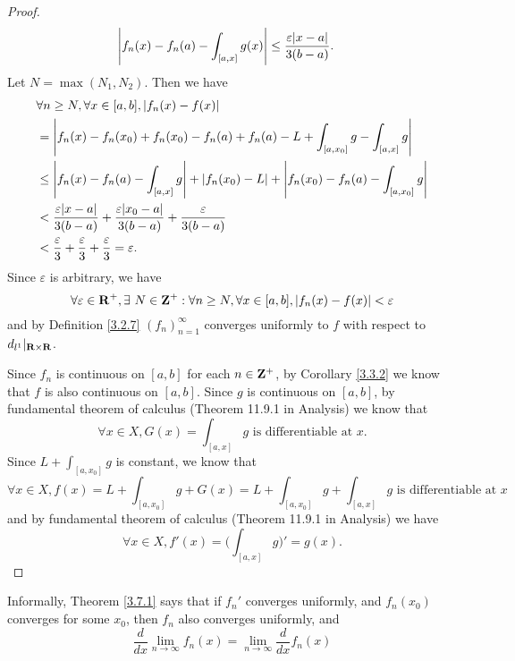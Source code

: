\begin{proof}
\begin{align*}
                 & \abs{f_n(x) - f_n(a) - \int_{[a, x]} g(x)} \leq \frac{\varepsilon \abs{x - a}}{3(b - a)}.
    \end{align*}
    Let \(N = \max(N_1, N_2)\).
    Then we have
    \begin{align*}
         & \forall n \geq N, \forall x \in [a, b], \abs{f_n(x) - f(x)}                                                            \\
         & = \abs{f_n(x) - f_n(x_0) + f_n(x_0) - f_n(a) + f_n(a) - L + \int_{[a, x_0]} g - \int_{[a, x]} g}                       \\
         & \leq \abs{f_n(x) - f_n(a) - \int_{[a, x]} g} + \abs{f_n(x_0) - L} + \abs{f_n(x_0) - f_n(a) - \int_{[a, x_0]} g}        \\
         & < \frac{\varepsilon \abs{x - a}}{3(b - a)} + \frac{\varepsilon \abs{x_0 - a}}{3(b - a)} + \frac{\varepsilon}{3(b - a)} \\
         & < \frac{\varepsilon}{3} + \frac{\varepsilon}{3} + \frac{\varepsilon}{3} = \varepsilon.
    \end{align*}
    Since \(\varepsilon\) is arbitrary, we have
    \[
        \forall \varepsilon \in \mathbf{R}^+, \exists\ N \in \mathbf{Z}^+ : \forall n \geq N, \forall x \in [a, b], \left\lvert f_n(x) - f(x)\right\rvert < \varepsilon
    \]
    and by Definition \ref{3.2.7} \((f_n)_{n = 1}^\infty\) converges uniformly to \(f\) with respect to \(d_{l^1}|_{\mathbf{R} \times \mathbf{R}}\).

    Since \(f_n\) is continuous on \([a, b]\) for each \(n \in \mathbf{Z}^+\), by Corollary \ref{3.3.2} we know that \(f\) is also continuous on \([a, b]\).
    Since \(g\) is continuous on \([a, b]\), by fundamental theorem of calculus (Theorem 11.9.1 in Analysis) we know that
    \[
        \forall x \in X, G(x) = \int_{[a, x]} g \text{ is differentiable at } x.
    \]
    Since \(L + \int_{[a, x_0]} g\) is constant, we know that
    \[
        \forall x \in X, f(x) = L + \int_{[a, x_0]} g + G(x) = L + \int_{[a, x_0]} g + \int_{[a, x]} g \text{ is differentiable at } x
    \]
    and by fundamental theorem of calculus (Theorem 11.9.1 in Analysis) we have
    \[
        \forall x \in X, f'(x) = \bigg(\int_{[a, x]} g\bigg)' = g(x).
    \]
\end{proof}

\begin{note}
    Informally, Theorem \ref{3.7.1} says that if \(f_n'\) converges uniformly, and \(f_n(x_0)\) converges for some \(x_0\), then \(f_n\) also converges uniformly, and
    \[
        \frac{d}{dx} \lim_{n \to \infty} f_n(x) = \lim_{n \to \infty} \frac{d}{dx} f_n(x)
    \]
\end{note}

